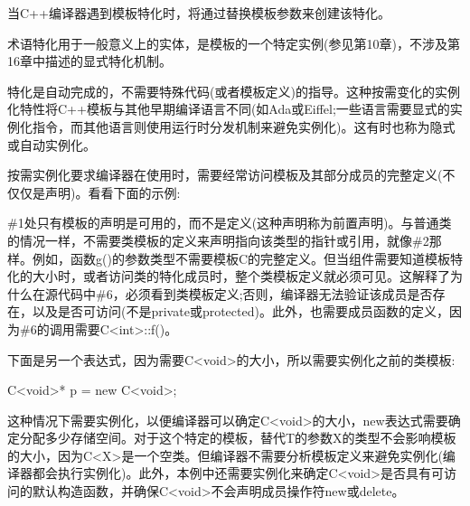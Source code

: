 当C++编译器遇到模板特化时，将通过替换模板参数来创建该特化。

\begin{notice}术语特化用于一般意义上的实体，是模板的一个特定实例(参见第10章)，不涉及第16章中描述的显式特化机制。
\end{notice}

特化是自动完成的，不需要特殊代码(或者模板定义)的指导。这种按需变化的实例化特性将C++模板与其他早期编译语言不同(如Ada或Eiffel;一些语言需要显式的实例化指令，而其他语言则使用运行时分发机制来避免实例化)。这有时也称为隐式或自动实例化。

按需实例化要求编译器在使用时，需要经常访问模板及其部分成员的完整定义(不仅仅是声明)。看看下面的示例:


\#1处只有模板的声明是可用的，而不是定义(这种声明称为前置声明)。与普通类的情况一样，不需要类模板的定义来声明指向该类型的指针或引用，就像\#2那样。例如，函数g()的参数类型不需要模板C的完整定义。但当组件需要知道模板特化的大小时，或者访问类的特化成员时，整个类模板定义就必须可见。这解释了为什么在源代码中\#6，必须看到类模板定义;否则，编译器无法验证该成员是否存在，以及是否可访问(不是private或protected)。此外，也需要成员函数的定义，因为\#6的调用需要C<int>::f()。

下面是另一个表达式，因为需要C<void>的大小，所以需要实例化之前的类模板:

\begin{cpp}
C<void>* p = new C<void>;
\end{cpp}

这种情况下需要实例化，以便编译器可以确定C<void>的大小，new表达式需要确定分配多少存储空间。对于这个特定的模板，替代T的参数X的类型不会影响模板的大小，因为C<X>是一个空类。但编译器不需要分析模板定义来避免实例化(编译器都会执行实例化)。此外，本例中还需要实例化来确定C<void>是否具有可访问的默认构造函数，并确保C<void>不会声明成员操作符new或delete。

